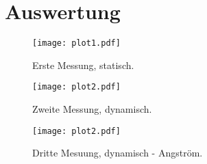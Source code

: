 \section{Auswertung}
\label{sec:Auswertung}

\begin{figure}
    \centering
    \texttt{[image: plot1.pdf]}
    \caption{Erste Messung, statisch.}
    \label{fig:plot1}
\end{figure}

\begin{figure}
    \centering
    \texttt{[image: plot2.pdf]}
    \caption{Zweite Messung, dynamisch.}
    \label{fig:plot2}
\end{figure}

\begin{figure}
    \centering
    \texttt{[image: plot2.pdf]}
    \caption{Dritte Mesuung, dynamisch - Angström.}
    \label{fig:plot2}
\end{figure}